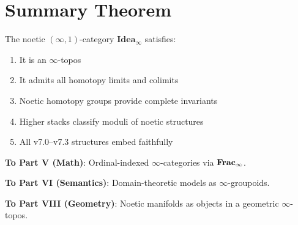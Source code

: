 \section{Summary Theorem}

\begin{theorem}
\label{thm:summary}
The noetic $(\infty,1)$-category $\mathbf{Idea}_\infty$ satisfies:
\begin{enumerate}[label=(\roman*)]
  \item It is an $\infty$-topos
  \item It admits all homotopy limits and colimits
  \item Noetic homotopy groups provide complete invariants
  \item Higher stacks classify moduli of noetic structures
  \item All v7.0--v7.3 structures embed faithfully
\end{enumerate}
\end{theorem}

\begin{tcolorbox}[colback=green!5!white,colframe=green!75!black,title=\textbf{Cross-Track Connections}]
\textbf{To Part V (Math)}: Ordinal-indexed $\infty$-categories via $\mathbf{Frac}_\infty$.

\textbf{To Part VI (Semantics)}: Domain-theoretic models as $\infty$-groupoids.

\textbf{To Part VIII (Geometry)}: Noetic manifolds as objects in a geometric
$\infty$-topos.
\end{tcolorbox}
